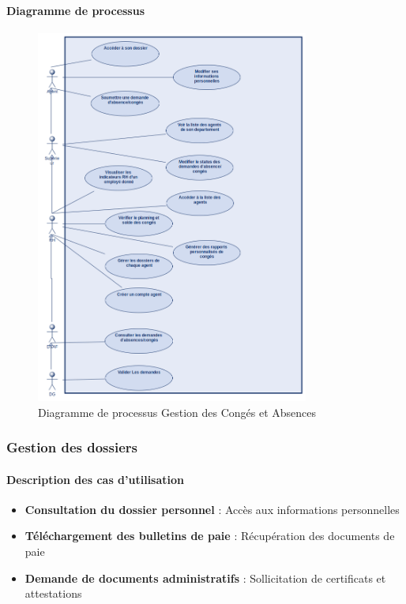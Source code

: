 \paragraph{Diagramme de processus}
\begin{figure}[H]
    \centering
    \includegraphics[width=0.8\textwidth]{images/diagrammes/flowcharts/conges.png}
    \caption{Diagramme de processus Gestion des Congés et Absences}
    \label{fig:flow_gestion_conges}
\end{figure}

\subsubsection{Gestion des dossiers}
\paragraph{Description des cas d'utilisation}
\begin{itemize}
    \item \textbf{Consultation du dossier personnel} : Accès aux informations personnelles
    \item \textbf{Téléchargement des bulletins de paie} : Récupération des documents de paie
    \item \textbf{Demande de documents administratifs} : Sollicitation de certificats et attestations
\end{itemize}

